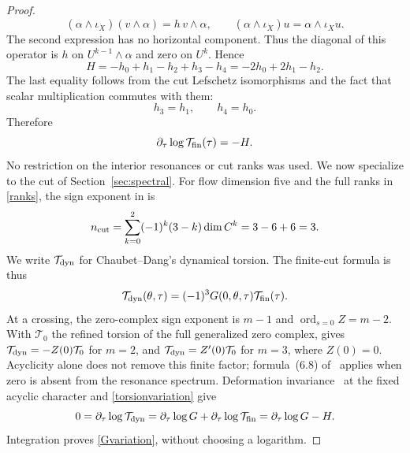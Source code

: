 \documentclass[11pt,letterpaper,reqno]{amsart}
\theoremstyle{remark}
\begin{document}
\begin{proof}
\[
 (\alpha\wedge\iota_{\dot X})(v\wedge\alpha)=h\,v\wedge\alpha,
 \qquad (\alpha\wedge\iota_{\dot X})u
       =\alpha\wedge\iota_{\dot X}u.
\]
The second expression has no horizontal component. Thus the diagonal
of this operator is $h$ on $U^{k-1}\wedge\alpha$ and zero on $U^k$.
Hence
\begin{equation}\label{xp:full-cut-supertrace}
 H=-h_0+h_1-h_2+h_3-h_4=-2h_0+2h_1-h_2.
\end{equation}
The last equality follows from the cut Lefschetz isomorphisms and the
fact that scalar multiplication commutes with them:
\[
 h_3=h_1,\qquad h_4=h_0.
\]
Therefore
\begin{equation}\label{torsionvariation}
 \partial_\tau\log\mathcal T_{\rm fin}(\tau)=-H.
\end{equation}
No restriction on the interior resonances or cut ranks was used.
We now specialize to the cut of Section~\ref{sec:spectral}.
For flow dimension five and the full ranks in \eqref{ranks}, the
sign exponent in \cite[(6.6)]{CD} is
\[
 n_{\rm cut}=\sum_{k=0}^2(-1)^k(3-k)\dim C^k
            =3-6+6=3.
\]
We write $\mathcal T_{\rm dyn}$ for Chaubet--Dang's dynamical torsion.
The finite-cut formula is thus
\begin{equation}\label{dynamicalbridge}
 \mathcal T_{\rm dyn}(\theta,\tau)
 =(-1)^3G(0,\theta,\tau)\mathcal T_{\rm fin}(\tau).
\end{equation}
At a crossing, the zero-complex sign exponent is $m-1$ and
$\operatorname{ord}_{s=0}Z=m-2$. With $\mathcal T_0$ the refined torsion
of the full generalized zero complex, \cite[(6.7)]{CD} gives
$\mathcal T_{\rm dyn}=-Z(0)\mathcal T_0$ for $m=2$, and
$\mathcal T_{\rm dyn}=Z'(0)\mathcal T_0$ for $m=3$, where $Z(0)=0$.
Acyclicity alone does not remove this finite factor; formula~(6.8)
of~\cite{CD} applies when zero is absent from the resonance spectrum.
Deformation invariance~\cite[Theorem~9]{CD} at the fixed acyclic character and
\eqref{torsionvariation} give
\[
 0=\partial_\tau\log\mathcal T_{\rm dyn}
   =\partial_\tau\log G+\partial_\tau\log\mathcal T_{\rm fin}
   =\partial_\tau\log G-H.
\]
Integration proves \eqref{Gvariation}, without choosing a logarithm.


\end{proof}
\end{document}
